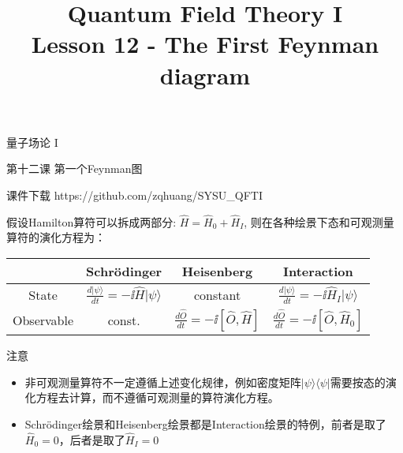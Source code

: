 \documentclass[CJK]{beamer}
\title{Quantum Field Theory I \\ Lesson 12 - The First Feynman diagram}
\author{}
\date{}
\begin{document}
\begin{frame}
 
\begin{center}
\begin{Large}
\bch
量子场论 I 

{\vskip 0.3in}

第十二课 第一个Feynman图

\ech
\end{Large}
\end{center}

\vskip 0.2in

\bch
课件下载
\ech
https://github.com/zqhuang/SYSU\_QFTI

\end{frame}


\begin{frame} 
\bch
假设Hamilton算符可以拆成两部分: $\hat{H} = \hat{H}_0 + \hat{H}_I$, 则在各种绘景下态和可观测量算符的演化方程为：

\begin{tabular}{c|c|c|c}
\hline
\hline
            & Schr\"odinger & Heisenberg  & Interaction \\
\hline
State         & $\frac{d |\psi\rangle}{dt} = - \ii \hat{H}|\psi\rangle$ & constant & $\frac{d |\psi\rangle}{dt} = - \ii \hat{H}_I|\psi\rangle$  \\
\hline
Observable & const. & $\frac{d\hat{O}}{dt} = -\ii [ \hat{O}, \hat{H} ]$ & $\frac{d\hat{O}}{dt} = -\ii [ \hat{O}, \hat{H}_0 ]$ \\
\hline
\end{tabular}

注意
\begin{itemize}
\item{非可观测量算符不一定遵循上述变化规律，例如密度矩阵$|\psi\rangle\langle\psi|$需要按态的演化方程去计算，而不遵循可观测量的算符演化方程。}
\item{Schr\"odinger绘景和Heisenberg绘景都是Interaction绘景的特例，前者是取了$\hat{H}_0 = 0$，后者是取了$\hat{H}_I = 0$}
\end{itemize}

\ech
\end{frame}
\end{document}
